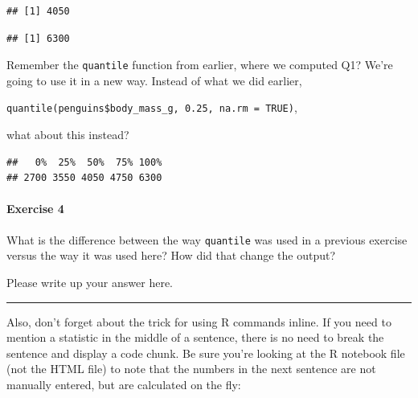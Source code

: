 \documentclass[
]{book}
\newenvironment{Shaded}{\begin{snugshade}}{\end{snugshade}}
\newcommand{\AttributeTok}[1]{\textcolor[rgb]{0.77,0.63,0.00}{#1}}
\newcommand{\ConstantTok}[1]{\textcolor[rgb]{0.00,0.00,0.00}{#1}}
\newcommand{\FunctionTok}[1]{\textcolor[rgb]{0.00,0.00,0.00}{#1}}
\newcommand{\NormalTok}[1]{#1}
\newcommand{\SpecialCharTok}[1]{\textcolor[rgb]{0.00,0.00,0.00}{#1}}
\begin{document}
\begin{verbatim}
## [1] 4050
\end{verbatim}

\begin{Shaded}
\end{Shaded}

\begin{verbatim}
## [1] 6300
\end{verbatim}

Remember the \texttt{quantile} function from earlier, where we computed Q1? We're going to use it in a new way. Instead of what we did earlier,

\texttt{quantile(penguins\$body\_mass\_g,\ 0.25,\ na.rm\ =\ TRUE)},

what about this instead?

\begin{Shaded}
\end{Shaded}

\begin{verbatim}
##   0%  25%  50%  75% 100% 
## 2700 3550 4050 4750 6300
\end{verbatim}

\hypertarget{exercise-4-1}{%
\paragraph*{Exercise 4}\label{exercise-4-1}}

What is the difference between the way \texttt{quantile} was used in a previous exercise versus the way it was used here? How did that change the output?

Please write up your answer here.

\begin{center}\rule{0.5\linewidth}{0.5pt}\end{center}

Also, don't forget about the trick for using R commands inline. If you need to mention a statistic in the middle of a sentence, there is no need to break the sentence and display a code chunk. Be sure you're looking at the R notebook file (not the HTML file) to note that the numbers in the next sentence are not manually entered, but are calculated on the fly:
\end{document}
